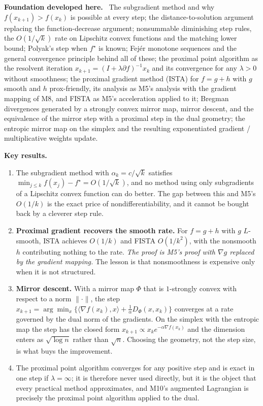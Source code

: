 \documentclass[11pt,a4paper]{article}
\newcommand{\mpart}[1]{\smallskip\noindent\textbf{#1}\ \ignorespaces}
\begin{document}
\mpart{Foundation developed here.} The subgradient method and why $f(x_{k+1})>f(x_k)$ is
possible at every step; the distance-to-solution argument replacing the function-decrease
argument; nonsummable diminishing step rules, the $O(1/\sqrt k)$ rate on Lipschitz convex
functions and the matching lower bound; Polyak's step when $f^\star$ is known; Fej\'er
monotone sequences and the general convergence principle behind all of these; the proximal
point algorithm as the resolvent iteration $x_{k+1}=(I+\lambda\partial f)^{-1}x_k$ and its
convergence for any $\lambda>0$ without smoothness; the proximal gradient method (ISTA) for
$f=g+h$ with $g$ smooth and $h$ prox-friendly, its analysis as M5's analysis with the gradient
mapping of M8, and FISTA as M5's acceleration applied to it; Bregman divergences generated by
a strongly convex mirror map, mirror descent, and the equivalence of the mirror step with a
proximal step in the dual geometry; the entropic mirror map on the simplex and the resulting
exponentiated gradient / multiplicative weights update.

\mpart{Key results.}
\begin{enumerate}
\item The subgradient method with $\alpha_k=c/\sqrt k$ satisfies
$\min_{j\le k}f(x_j)-f^\star = O(1/\sqrt k)$, and no method using only subgradients of a
Lipschitz convex function can do better. The gap between this and M5's $O(1/k)$ is the exact
price of nondifferentiability, and it cannot be bought back by a cleverer step rule.
\item \textbf{Proximal gradient recovers the smooth rate.} For $f=g+h$ with $g$ $L$-smooth,
ISTA achieves $O(1/k)$ and FISTA $O(1/k^2)$, with the nonsmooth $h$ contributing nothing to
the rate. \emph{The proof is M5's proof with $\nabla g$ replaced by the gradient mapping.} The
lesson is that nonsmoothness is expensive only when it is not structured.
\item \textbf{Mirror descent.} With a mirror map $\Phi$ that is $1$-strongly convex with
respect to a norm $\|\cdot\|$, the step
$x_{k+1}=\arg\min_x\{\langle\nabla f(x_k),x\rangle+\tfrac1{\alpha}D_\Phi(x,x_k)\}$ converges
at a rate governed by the dual norm of the gradients. On the simplex with the entropic map the
step has the closed form $x_{k+1}\propto x_k e^{-\alpha\nabla f(x_k)}$ and the dimension enters
as $\sqrt{\log n}$ rather than $\sqrt n$. Choosing the geometry, not the step size, is what
buys the improvement.
\item The proximal point algorithm converges for any positive step and is exact in one step
if $\lambda=\infty$; it is therefore never used directly, but it is the object that every
practical method approximates, and M10's augmented Lagrangian is precisely the proximal point
algorithm applied to the dual.
\end{enumerate}
\end{document}
